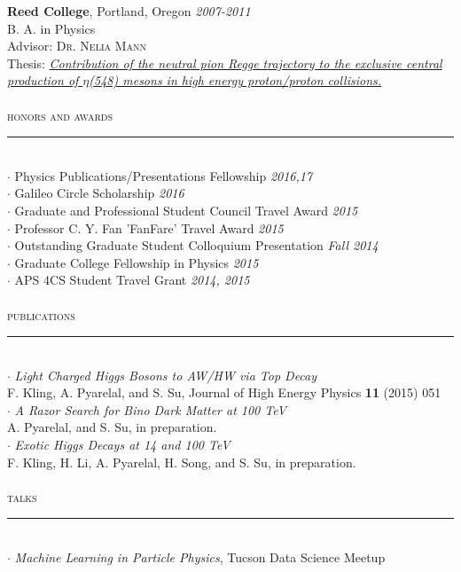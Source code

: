 \documentclass[10pt]{report}
\newcommand{\HRule}{\rule[2mm]{\linewidth}{0.1mm}}
\begin{document}
\small \textsf{\textbf{Reed College}}, \textsf{\normalsize Portland, Oregon} \hfill \textit{\small 2007-2011}\\
\small B. A. in Physics\\
Advisor: \textsc{\small Dr. Nelia Mann}\\
Thesis: \href{http://www.physics.arizona.edu/~adarsh/research/reedthesis/}{\emph{Contribution of the neutral pion Regge trajectory to the exclusive central production of $\eta$(548) mesons in high energy proton/proton collisions.}}
\\\\
\large\textsc{honors and awards}\\
\HRule\\
$\cdot$ \small Physics Publications/Presentations Fellowship
\hfill \textit{2016,17}\\
$\cdot$ \small Galileo Circle Scholarship
\hfill \textit{2016}\\
$\cdot$ \small Graduate and Professional Student Council Travel Award
\hfill \textit{2015}\\
$\cdot$ \small Professor C. Y. Fan 'FanFare' Travel Award
\hfill \textit{2015}\\
$\cdot$ \small Outstanding Graduate Student Colloquium Presentation
\hfill \textit{Fall 2014}\\
$\cdot$ \small Graduate College Fellowship in Physics
\hfill \textit{2015}\\
\small $\cdot$ APS 4CS Student Travel Grant
\hfill \textit{\small 2014, 2015}
\\\\
\large\textsc{publications}\\
\HRule\\
\small $\cdot$ \emph{Light Charged Higgs Bosons to AW/HW via Top Decay}\\
F. Kling, A. Pyarelal, and S. Su, Journal of High Energy Physics \textbf{11} (2015) 051\\
\small $\cdot$ \emph{A Razor Search for Bino Dark Matter at 100 TeV}\\
A. Pyarelal, and S. Su, in preparation.\\
\small $\cdot$ \emph{Exotic Higgs Decays at 14 and 100 TeV}\\
F. Kling, H. Li, A. Pyarelal, H. Song, and S. Su, in preparation.
\\\\
\large\textsc{talks}\\
\HRule\\
\small $\cdot$ \emph{Machine Learning in Particle Physics}, Tucson Data Science Meetup
\end{document}
